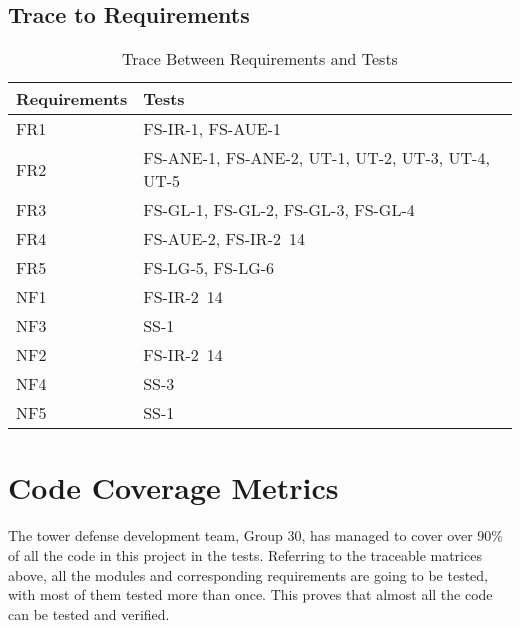 \documentclass[12pt]{article}
\begin{document}
\subsection{Trace to Requirements}
    \FloatBarrier
        \begin{table}[!htbp]
        \begin{tabular}{ll}
        \toprule
        Requirements & Tests \\
        \midrule
        \color{red}
        FR1 & FS-IR-1, FS-AUE-1\\
        \color{red}
        FR2 & FS-ANE-1, FS-ANE-2, UT-1, UT-2, UT-3, UT-4, UT-5\\
        \color{red}
        FR3 & FS-GL-1, FS-GL-2, FS-GL-3, FS-GL-4\\
        \color{red}
        FR4 & FS-AUE-2, FS-IR-2~14\\
        \color{red}
        FR5 & FS-LG-5, FS-LG-6\\
        \color{red}
        NF1 & FS-IR-2~14\\
        \color{red}
        NF3 & SS-1\\
        \color{red}
        NF2 & FS-IR-2~14\\
        \color{red}
        NF4 & SS-3\\
        \color{red}
        NF5 & SS-1\\
    
        \bottomrule
        \end{tabular}
        \caption{Trace Between Requirements and Tests}
        \makeatletter
           \def\rulecolor#1#{\CT@arc{#1}}
           \def\CT@arc#1#2{%
           \ifdim\baselineskip=\z@\noalign\fi
           {\gdef\CT@arc@{\color#1{#2}}}}
           \let\CT@arc@\relax
        \makeatother
        \label{Table 3}
        \end{table}
\FloatBarrier	

\color{red}
\section{Code Coverage Metrics}
The tower defense development team, Group 30, has managed to cover over 90\% of all the code in this project in the tests. Referring to the traceable matrices above, all the modules and corresponding requirements are going to be tested, with most of them tested more than once. This proves that almost all the code can be tested and verified. 
\end{document}

